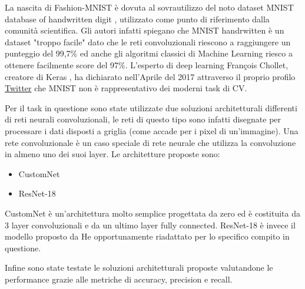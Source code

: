 La nascita di Fashion-MNIST è dovuta al sovrautilizzo del noto dataset MNIST database of handwritten digit  \cite{lecun1998mnist}, utilizzato come punto di riferimento dalla comunità scientifica. Gli autori infatti spiegano che MNIST handrwitten è un dataset "troppo facile" dato che le reti convoluzionali riescono a raggiungere un punteggio del 99,7\% ed anche gli algoritmi classici di Machine Learning riesco a ottenere facilmente score del 97\%. L'esperto di deep learning François Chollet, creatore di Keras \cite{chollet2015keras}, ha dichiarato nell'Aprile del 2017 attraverso il proprio profilo \href{https://twitter.com/fchollet/status/852594987527045120}{Twitter} che MNIST non è rappresentativo dei moderni task di CV.\par
Per il task in questione sono state utilizzate due soluzioni architetturali differenti di reti neurali convoluzionali, le reti di questo tipo sono infatti disegnate per processare i dati disposti a griglia (come accade per i pixel di un'immagine). Una rete convoluzionale è un caso speciale di rete neurale che utilizza la convoluzione in almeno uno dei suoi layer. Le architetture proposte sono:
\begin{itemize}
\item CustomNet
\item ResNet-18 \cite{he2016deep}
\end{itemize}
CustomNet è un'architettura molto semplice progettata da zero ed è costituita da 3 layer convoluzionali e da un ultimo layer fully connected. ResNet-18 è invece il modello proposto da He \etal{} opportunamente riadattato per lo specifico compito in questione.\par
Infine sono state testate le soluzioni architetturali proposte valutandone le performance grazie alle metriche di accuracy, precision e recall.
